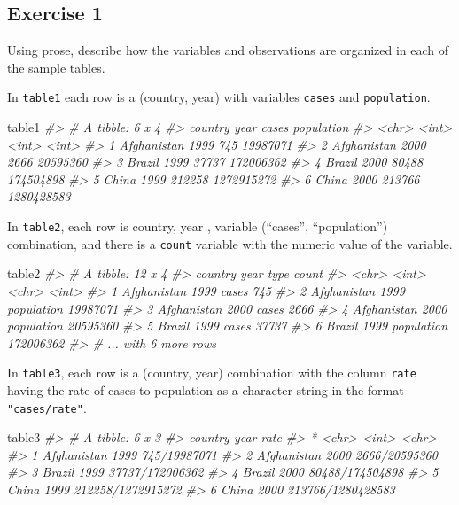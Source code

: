 \documentclass[]{book}
\newenvironment{Shaded}{\begin{snugshade}}{\end{snugshade}}
\newcommand{\CommentTok}[1]{\textcolor[rgb]{0.56,0.35,0.01}{\textit{#1}}}
\newcommand{\NormalTok}[1]{#1}
\theoremstyle{definition}
\theoremstyle{definition}
\theoremstyle{definition}
\theoremstyle{remark}
\begin{document}
\hypertarget{exercise-1-16}{%
\subsection{Exercise 1}\label{exercise-1-16}}

Using prose, describe how the variables and observations are organized
in each of the sample tables.

In \texttt{table1} each row is a (country, year) with variables
\texttt{cases} and \texttt{population}.

\begin{Shaded}
\begin{Highlighting}[]
\NormalTok{table1}
\CommentTok{#> # A tibble: 6 x 4}
\CommentTok{#>   country      year  cases population}
\CommentTok{#>   <chr>       <int>  <int>      <int>}
\CommentTok{#> 1 Afghanistan  1999    745   19987071}
\CommentTok{#> 2 Afghanistan  2000   2666   20595360}
\CommentTok{#> 3 Brazil       1999  37737  172006362}
\CommentTok{#> 4 Brazil       2000  80488  174504898}
\CommentTok{#> 5 China        1999 212258 1272915272}
\CommentTok{#> 6 China        2000 213766 1280428583}
\end{Highlighting}
\end{Shaded}

In \texttt{table2}, each row is country, year , variable (``cases'',
``population'') combination, and there is a \texttt{count} variable with
the numeric value of the variable.

\begin{Shaded}
\begin{Highlighting}[]
\NormalTok{table2}
\CommentTok{#> # A tibble: 12 x 4}
\CommentTok{#>   country      year type           count}
\CommentTok{#>   <chr>       <int> <chr>          <int>}
\CommentTok{#> 1 Afghanistan  1999 cases            745}
\CommentTok{#> 2 Afghanistan  1999 population  19987071}
\CommentTok{#> 3 Afghanistan  2000 cases           2666}
\CommentTok{#> 4 Afghanistan  2000 population  20595360}
\CommentTok{#> 5 Brazil       1999 cases          37737}
\CommentTok{#> 6 Brazil       1999 population 172006362}
\CommentTok{#> # ... with 6 more rows}
\end{Highlighting}
\end{Shaded}

In \texttt{table3}, each row is a (country, year) combination with the
column \texttt{rate} having the rate of cases to population as a
character string in the format \texttt{"cases/rate"}.

\begin{Shaded}
\begin{Highlighting}[]
\NormalTok{table3}
\CommentTok{#> # A tibble: 6 x 3}
\CommentTok{#>   country      year rate             }
\CommentTok{#> * <chr>       <int> <chr>            }
\CommentTok{#> 1 Afghanistan  1999 745/19987071     }
\CommentTok{#> 2 Afghanistan  2000 2666/20595360    }
\CommentTok{#> 3 Brazil       1999 37737/172006362  }
\CommentTok{#> 4 Brazil       2000 80488/174504898  }
\CommentTok{#> 5 China        1999 212258/1272915272}
\CommentTok{#> 6 China        2000 213766/1280428583}
\end{Highlighting}
\end{Shaded}
\end{document}
